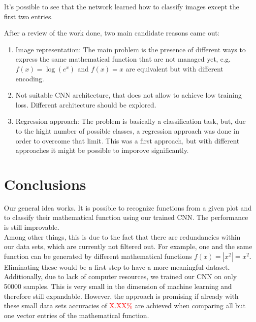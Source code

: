 \documentclass[11pt,a4paper]{scrartcl}
\begin{document}
	It's possible to see that the network learned how to classify images except the first two entries.
	
	After a review of the work done, two main candidate reasons came out:
	\begin{enumerate}
		\item Image representation: The main problem is the presence of different ways to express the same mathematical function that are not managed yet, e.g. $f(x) = \log(e^x)$ and $f(x) = x$ are equivalent but with different encoding.
		\item Not suitable CNN architecture, that does not allow to achieve low training loss. Different architecture should be explored.
		\item Regression approach: The problem is basically a classification task, but, due to the hight number of possible classes, a regression approach was done in order to overcome that limit. This was a first approach, but with different approaches it might be possible to imporove significantly.
	\end{enumerate}
	\section{Conclusions}
	Our general idea works. It is possible to recognize functions from a given plot and to classify their mathematical function using our trained CNN. The performance is still improvable.\\
	Among other things, this is due to the fact that there are redundancies within our data sets, which are currently not filtered out. For example, one and the same function can be generated by different mathematical functions \(f(x) = |x^2| = x^2\). Eliminating these would be a first step to have a more meaningful dataset.\\
	Additionally, due to lack of computer resources, we trained our CNN on only 50000 samples. This is very small in the dimension of machine learning and therefore still expandable. However, the approach is promising if already with these small data sets accuracies of \textcolor{red}{X.XX\%} are achieved when comparing all but one vector entries of the mathematical function. 
\end{document}
